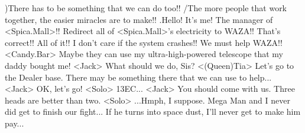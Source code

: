 )There has to be something that we can do too!! 
/The more people that work together, the easier miracles are to make!! 
.Hello! It's me! The manager of <Spica.Mall>!! 
Redirect all of <Spica.Mall>'s electricity to WAZA!! 
That's correct!! All of it!! 
I don't care if the system crashes!! We must help WAZA!! 
<Candy.Bar> Maybe they can use my ultra-high-powered telescope that my daddy bought me! 
<Jack> What should we do, Sis? 
<(Queen)Tia> Let's go to the Dealer base. 
There may be something there that we can use to help... 
<Jack> OK, let's go! 
<Solo> {13}{EC}... 
<Jack> You should come with us. 
Three heads are better than two. 
<Solo> ...Hmph, I suppose. 
Mega Man and I never did get to finish our fight... 
If he turns into space dust, I'll never get to make him pay... 
